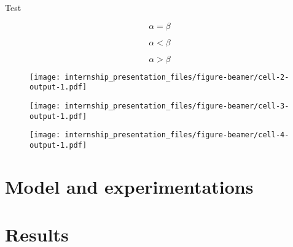 \documentclass[
  ignorenonframetext,
]{beamer}
\begin{document}
\begin{frame}{Test}
\label{test}
\begin{figure}

\begin{minipage}{0.33\linewidth}
\[\alpha = \beta\]\end{minipage}%
%
\begin{minipage}{0.33\linewidth}
\[\alpha < \beta\]\end{minipage}%
%
\begin{minipage}{0.33\linewidth}
\[\alpha > \beta\]\end{minipage}%

\end{figure}%

\begin{figure}

\begin{minipage}{0.33\linewidth}

\texttt{[image: internship\_presentation\_files/figure-beamer/cell-2-output-1.pdf]}

\end{minipage}%
%
\begin{minipage}{0.33\linewidth}

\texttt{[image: internship\_presentation\_files/figure-beamer/cell-3-output-1.pdf]}

\end{minipage}%
%
\begin{minipage}{0.33\linewidth}

\texttt{[image: internship\_presentation\_files/figure-beamer/cell-4-output-1.pdf]}

\end{minipage}%

\end{figure}%
\end{frame}

\section{Model and experimentations}\label{model-and-experimentations}

\section{Results}\label{results}
\end{document}
